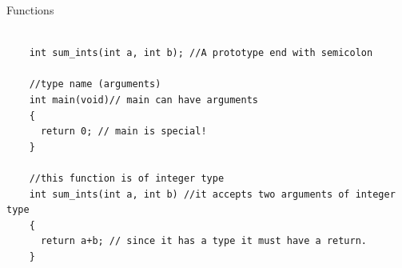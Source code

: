 \documentclass[10pt]{beamer}
\begin{document}
\begin{frame}[fragile]{Functions}

    \begin{lstlisting}

    int sum_ints(int a, int b); //A prototype end with semicolon

    //type name (arguments)
    int main(void)// main can have arguments
    {
      return 0; // main is special!
    }
   
    //this function is of integer type
    int sum_ints(int a, int b) //it accepts two arguments of integer type
    {
      return a+b; // since it has a type it must have a return.
    }
    \end{lstlisting}
    \vspace{0.2cm}
 
\end{frame}
\end{document}

